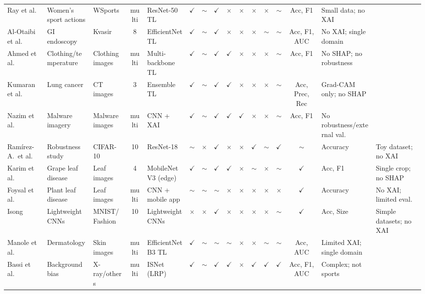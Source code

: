 \documentclass[review]{elsarticle}
\newcommand{\cmark}{\ensuremath{\checkmark}}
\newcommand{\xmark}{\ensuremath{\times}}
\newcommand{\pmark}{\ensuremath{\sim}}
\begin{document}
\begin{table}
\begin{tabular}{@{}p{1.5cm}p{1.6cm}p{1.4cm}cp{1.8cm}ccccccccc p{1.5cm}p{2.1cm}@{}}
Ray et al.\ \citep{ray2025womensports} & Women's sport actions & WSports & multi & ResNet-50 TL & \cmark & \pmark & \cmark & \xmark & \xmark & \xmark & \xmark & \pmark & Acc, F1 & Small data; no XAI \\
Al-Otaibi et al.\ \citep{alotaibi2024gastro} & GI endoscopy & Kvasir & 8 & EfficientNet TL & \cmark & \pmark & \cmark & \xmark & \xmark & \xmark & \pmark & \pmark & Acc, F1, AUC & No XAI; single domain \\
Ahmed et al.\ \citep{ahmed2024clothing} & Clothing/temperature & Clothing images & multi & Multi-backbone TL & \cmark & \pmark & \cmark & \cmark & \xmark & \xmark & \xmark & \pmark & Acc, F1 & No SHAP; no robustness \\
Kumaran et al.\ \citep{kumaran2024lungcam} & Lung cancer & CT images & 3 & Ensemble TL & \cmark & \pmark & \cmark & \cmark & \xmark & \xmark & \xmark & \pmark & Acc, Prec, Rec & Grad-CAM only; no SHAP \\
Nazim et al.\ \citep{nazim2025malware} & Malware imagery & Malware images & multi & CNN + XAI & \cmark & \pmark & \cmark & \cmark & \cmark & \xmark & \xmark & \pmark & Acc, F1 & No robustness/external val. \\
Ram\'irez-A.\ et al.\ \citep{ramirezagudelo2026noisy} & Robustness study & CIFAR-10 & 10 & ResNet-18 & \pmark & \xmark & \cmark & \xmark & \xmark & \cmark & \pmark & \cmark & \pmark & Accuracy & Toy dataset; no XAI \\
Karim et al.\ \citep{karim2024grapeleaf} & Grape leaf disease & Leaf images & 4 & MobileNetV3 (edge) & \cmark & \pmark & \cmark & \cmark & \xmark & \pmark & \xmark & \pmark & \cmark & Acc, F1 & Single crop; no SHAP \\
Foysal et al.\ \citep{foysal2024plantleaf} & Plant leaf disease & Leaf images & multi & CNN + mobile app & \pmark & \pmark & \pmark & \xmark & \xmark & \xmark & \xmark & \xmark & \cmark & Accuracy & No XAI; limited eval. \\
Isong \citep{isong2025lightweight} & Lightweight CNNs & MNIST/Fashion & 10 & Lightweight CNNs & \xmark & \xmark & \cmark & \xmark & \xmark & \xmark & \xmark & \pmark & \cmark & Acc, Size & Simple datasets; no XAI \\
Manole et al.\ \citep{manole2024dermatology} & Dermatology & Skin images & multi & EfficientNetB3 TL & \cmark & \pmark & \pmark & \pmark & \xmark & \xmark & \pmark & \pmark & Acc, AUC & Limited XAI; single domain \\
Bassi et al.\ \citep{bassi2024lrp} & Background bias & X-ray/others & multi & ISNet (LRP) & \cmark & \pmark & \cmark & \cmark & \xmark & \cmark & \cmark & \cmark & Acc, F1, AUC & Complex; not sports \\

\end{tabular}
\end{table}
\end{document}
